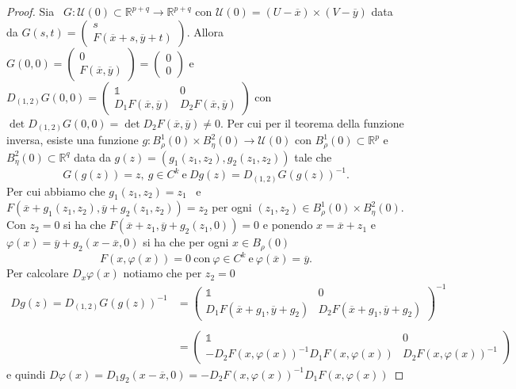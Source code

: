 \begin{proof}
Sia \ $G:\mathcal{U}(0)\subset\mathbb{R}^{p+q}\rightarrow\mathbb{R}^{p+q}$ con $\mathcal{U}(0) = (U -\overline{x}) \times (V - \overline{y})$ data da $G(s,t)=\begin{pmatrix}s\\F(\overline{x}+s,\overline{y}+t)\end{pmatrix}$. Allora $G(0,0) = \begin{pmatrix}0\\F(\overline{x},\overline{y})\end{pmatrix}=\begin{pmatrix}0\\0\end{pmatrix}$ e $D_{(1,2)}G(0,0)=\begin{pmatrix}\mathds{1} & 0\\D_{1}F(\overline{x},\overline{y}) & D_{2}F(\overline{x},\overline{y})\end{pmatrix}$ con $\det D_{(1,2)}G(0,0) = \det D_{2}F(\overline{x},\overline{y})\neq 0$. Per cui per il teorema della funzione inversa, esiste una funzione $g:B_{\rho}^{1}(0)\times B_{\eta}^{2}(0)\rightarrow\mathcal{U}(0)$ con $B_{\rho}^{1}(0)\subset\mathbb{R}^{p}$ e $B_{\eta}^{2}(0)\subset\mathbb{R}^{q}$ data da $g(z)=(g_{1}(z_{1},z_{2}),g_{2}(z_{1},z_{2}))$ tale che 
\begin{equation*}
G(g(z))=z, \ g\in C^{k} \ \text{e} \ Dg(z)=D_{(1,2)}G(g(z))^{-1}.
\end{equation*}
Per cui abbiamo che $g_{1}(z_{1},z_{2})=z_{1}$ \ e \ $F(\overline{x}+g_{1}(z_{1},z_{2}),\overline{y}+g_{2}(z_{1},z_{2}))=z_{2}$ per ogni $(z_{1},z_{2})\in B_{\rho}^{1}(0)\times B_{\eta}^{2}(0)$. Con $z_{2}=0$ si ha che $F(\overline{x}+z_{1},\overline{y}+g_{2}(z_{1},0)) = 0$ e ponendo $x=\overline{x}+z_{1}$ e $\varphi(x)=\overline{y}+g_{2}(x-\overline{x},0)$ si ha che per ogni $x\in B_{\rho}(0)$
\begin{equation*}
F(x,\varphi(x))=0 \ \text{con} \ \varphi\in C^{k} \ \text{e} \ \varphi(\overline{x})=\overline{y}.
\end{equation*}
Per calcolare $D_{x}\varphi(x)$ notiamo che per $z_{2}=0$
\begin{align*}
Dg(z)=D_{(1,2)}G(g(z))^{-1} & = \begin{pmatrix}\mathds{1} & 0 \\ D_{1}F(\overline{x}+g_{1},\overline{y}+g_{2}) & D_{2}F(\overline{x}+g_{1},\overline{y}+g_{2})\end{pmatrix}^{-1}\\ \\
                                & = \begin{pmatrix}\mathds{1} & 0 \\ 
 -D_{2}F(x,\varphi(x))^{-1}D_{1}F(x,\varphi(x)) & D_{2}F(x,\varphi(x))^{-1}\end{pmatrix}
\end{align*}
e quindi $D\varphi(x)=D_{1}g_{2}(x-\overline{x},0)=-D_{2}F(x,\varphi(x))^{-1}D_{1}F(x,\varphi(x))$
\end{proof}

